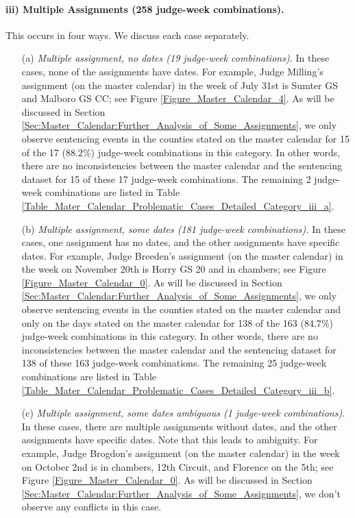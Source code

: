 \documentclass[11pt, oneside]{article}   	%
\theoremstyle{ModifiedStyle}
\begin{document}
		\paragraph{iii) Multiple Assignments (258 judge-week combinations).}
		\label{Category_iii}
		This occurs in four ways. We discuss each case separately.
			\begin{itemize}
				\item[(a)] \emph{Multiple assignment, no dates (19 judge-week combinations).} In these cases, none of the assignments have dates. For example, Judge Milling's assignment (on the master calendar) in the week of July 31st is Sumter GS and Malboro GS CC; see Figure \ref{Figure_Master_Calendar_4}. As will be discussed in Section \ref{Sec:Master_Calendar:Further_Analysis_of_Some_Assignments}, we only observe sentencing events in the counties stated on the master calendar for 15 of the 17 ($88.2\%$) judge-week combinations in this category. In other words, there are no inconsistencies between the master calendar and the sentencing dataset for 15 of these 17 judge-week combinations. The remaining 2 judge-week combinations are listed in Table \ref{Table_Mater_Calendar_Problematic_Cases_Detailed_Category_iii_a}.
				\item[(b)] \emph{Multiple assignment, some dates (181 judge-week combinations).} In these cases, one assignment has no dates, and the other assignments have specific dates. For example, Judge Breeden's assignment (on the master calendar) in the week on November 20th is Horry GS 20 and in chambers; see Figure \ref{Figure_Master_Calendar_0}. As will be discussed in Section \ref{Sec:Master_Calendar:Further_Analysis_of_Some_Assignments}, we only observe sentencing events in the counties stated on the master calendar and only on the days stated on the master calendar for 138 of the 163 ($84.7\%$) judge-week combinations in this category. In other words, there are no inconsistencies between the master calendar and the sentencing dataset for 138 of these 163 judge-week combinations. The remaining 25 judge-week combinations are listed in Table \ref{Table_Mater_Calendar_Problematic_Cases_Detailed_Category_iii_b}.
				\item[(c)] \emph{Multiple assignment, some dates ambiguous (1 judge-week combinations).} In these cases, there are multiple assignments without dates, and the other assignments have specific dates. Note that this leads to ambiguity. For example, Judge Brogdon's assignment (on the master calendar) in the week on October 2nd is in chambers, 12th Circuit, and Florence on the 5th; see Figure \ref{Figure_Master_Calendar_0}. As will be discussed in Section \ref{Sec:Master_Calendar:Further_Analysis_of_Some_Assignments}, we don't observe any conflicts in this case.

\end{itemize}
\end{document}
